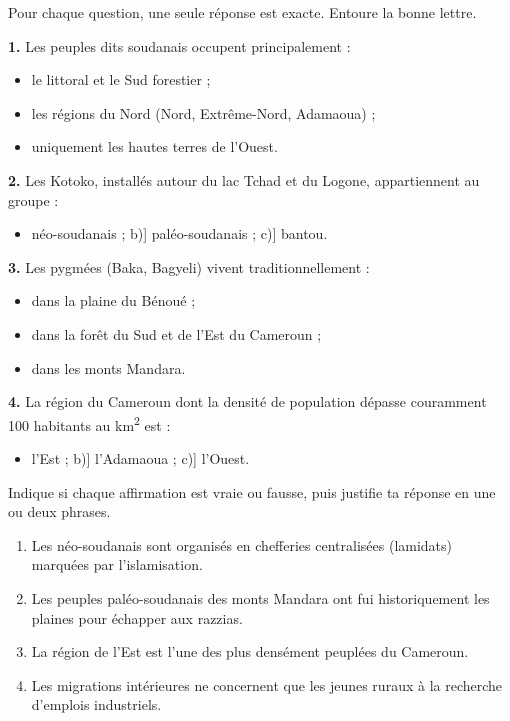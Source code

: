 \documentclass[11pt]{article}
\begin{document}
\begin{exercice}
Pour chaque question, une seule réponse est exacte. Entoure la bonne lettre.

\textbf{1.} Les peuples dits \og soudanais \fg{} occupent principalement :
\begin{itemize}
\item[a)] le littoral et le Sud forestier ;
\item[b)] les régions du Nord (Nord, Extrême-Nord, Adamaoua) ;
\item[c)] uniquement les hautes terres de l'Ouest.
\end{itemize}

\textbf{2.} Les Kotoko, installés autour du lac Tchad et du Logone, appartiennent au groupe :
\begin{itemize}
\item[a)] néo-soudanais ; \quad b)] paléo-soudanais ; \quad c)] bantou.
\end{itemize}

\textbf{3.} Les pygmées (Baka, Bagyeli) vivent traditionnellement :
\begin{itemize}
\item[a)] dans la plaine du Bénoué ;
\item[b)] dans la forêt du Sud et de l'Est du Cameroun ;
\item[c)] dans les monts Mandara.
\end{itemize}

\textbf{4.} La région du Cameroun dont la densité de population dépasse couramment 100 habitants au km\textsuperscript{2} est :
\begin{itemize}
\item[a)] l'Est ; \quad b)] l'Adamaoua ; \quad c)] l'Ouest.
\end{itemize}
\end{exercice}

\begin{exercice}
Indique si chaque affirmation est vraie ou fausse, puis justifie ta réponse en une ou deux phrases.
\begin{enumerate}
\item Les néo-soudanais sont organisés en chefferies centralisées (lamidats) marquées par l'islamisation.
\item Les peuples paléo-soudanais des monts Mandara ont fui historiquement les plaines pour échapper aux razzias.
\item La région de l'Est est l'une des plus densément peuplées du Cameroun.
\item Les migrations intérieures ne concernent que les jeunes ruraux à la recherche d'emplois industriels.
\end{enumerate}
\end{exercice}
\end{document}
